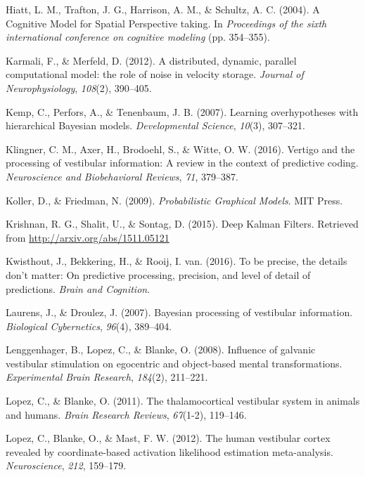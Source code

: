 \documentclass[english,floatsintext,man]{apa6}
\theoremstyle{definition}
\theoremstyle{definition}
\theoremstyle{remark}
\begin{document}
\hypertarget{ref-Hiatt:2004tv}{}
Hiatt, L. M., Trafton, J. G., Harrison, A. M., \& Schultz, A. C. (2004).
A Cognitive Model for Spatial Perspective taking. In \emph{Proceedings
of the sixth international conference on cognitive modeling} (pp.
354--355).

\hypertarget{ref-Karmali:2012cv}{}
Karmali, F., \& Merfeld, D. (2012). A distributed, dynamic, parallel
computational model: the role of noise in velocity storage.
\emph{Journal of Neurophysiology}, \emph{108}(2), 390--405.

\hypertarget{ref-Kemp:2007eo}{}
Kemp, C., Perfors, A., \& Tenenbaum, J. B. (2007). Learning
overhypotheses with hierarchical Bayesian models. \emph{Developmental
Science}, \emph{10}(3), 307--321.

\hypertarget{ref-Klingner:2016ia}{}
Klingner, C. M., Axer, H., Brodoehl, S., \& Witte, O. W. (2016). Vertigo
and the processing of vestibular information: A review in the context of
predictive coding. \emph{Neuroscience and Biobehavioral Reviews},
\emph{71}, 379--387.

\hypertarget{ref-Koller:2009ty}{}
Koller, D., \& Friedman, N. (2009). \emph{Probabilistic Graphical
Models}. MIT Press.

\hypertarget{ref-Krishnan:2015wr}{}
Krishnan, R. G., Shalit, U., \& Sontag, D. (2015). Deep Kalman Filters.
Retrieved from \url{http://arxiv.org/abs/1511.05121}

\hypertarget{ref-Kwisthout:2016fx}{}
Kwisthout, J., Bekkering, H., \& Rooij, I. van. (2016). To be precise,
the details don't matter: On predictive processing, precision, and level
of detail of predictions. \emph{Brain and Cognition}.

\hypertarget{ref-Laurens:2006be}{}
Laurens, J., \& Droulez, J. (2007). Bayesian processing of vestibular
information. \emph{Biological Cybernetics}, \emph{96}(4), 389--404.

\hypertarget{ref-Lenggenhager:2008et}{}
Lenggenhager, B., Lopez, C., \& Blanke, O. (2008). Influence of galvanic
vestibular stimulation on egocentric and object-based mental
transformations. \emph{Experimental Brain Research}, \emph{184}(2),
211--221.

\hypertarget{ref-Lopez:2011cc}{}
Lopez, C., \& Blanke, O. (2011). The thalamocortical vestibular system
in animals and humans. \emph{Brain Research Reviews}, \emph{67}(1-2),
119--146.

\hypertarget{ref-Lopez:2012ek}{}
Lopez, C., Blanke, O., \& Mast, F. W. (2012). The human vestibular
cortex revealed by coordinate-based activation likelihood estimation
meta-analysis. \emph{Neuroscience}, \emph{212}, 159--179.
\end{document}
